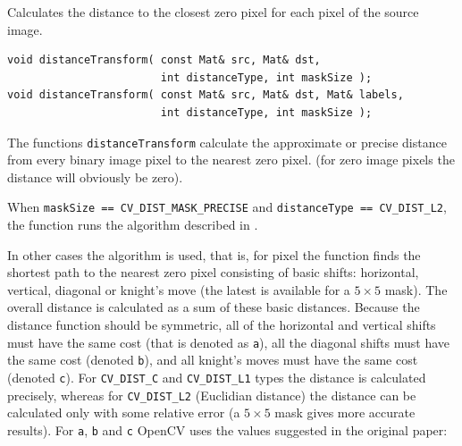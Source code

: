 \label{distanceTransform}
Calculates the distance to the closest zero pixel for each pixel of the source image.

\begin{lstlisting}
void distanceTransform( const Mat& src, Mat& dst,
                        int distanceType, int maskSize );
void distanceTransform( const Mat& src, Mat& dst, Mat& labels,
                        int distanceType, int maskSize );
\end{lstlisting}
\begin{description}
\end{description}

The functions \texttt{distanceTransform} calculate the approximate or precise
distance from every binary image pixel to the nearest zero pixel.
(for zero image pixels the distance will obviously be zero).

When \texttt{maskSize == CV\_DIST\_MASK\_PRECISE} and \texttt{distanceType == CV\_DIST\_L2}, the function runs the algorithm described in \cite{Felzenszwalb04}.

In other cases the algorithm \cite{Borgefors86} is used, that is,
for pixel the function finds the shortest path to the nearest zero pixel
consisting of basic shifts: horizontal,
vertical, diagonal or knight's move (the latest is available for a
$5\times 5$ mask). The overall distance is calculated as a sum of these
basic distances. Because the distance function should be symmetric,
all of the horizontal and vertical shifts must have the same cost (that
is denoted as \texttt{a}), all the diagonal shifts must have the
same cost (denoted \texttt{b}), and all knight's moves must have
the same cost (denoted \texttt{c}). For \texttt{CV\_DIST\_C} and
\texttt{CV\_DIST\_L1} types the distance is calculated precisely,
whereas for \texttt{CV\_DIST\_L2} (Euclidian distance) the distance
can be calculated only with some relative error (a $5\times 5$ mask
gives more accurate results). For \texttt{a}, \texttt{b} and \texttt{c}
OpenCV uses the values suggested in the original paper:


